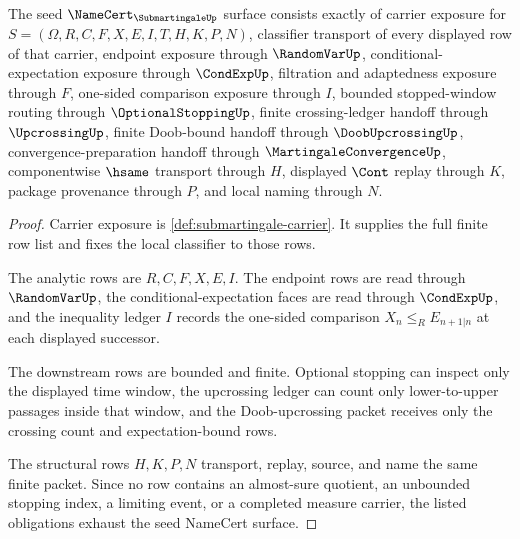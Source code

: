 \begin{theorem}
\label{thm:submartingale-namecert-obligations}
The seed $\NameCert_{\SubmartingaleUp}$ surface consists exactly of carrier exposure for $S=(\Omega,R,C,F,X,E,I,T,H,K,P,N)$, classifier transport of every displayed row of that carrier, endpoint exposure through $\RandomVarUp$, conditional-expectation exposure through $\CondExpUp$, filtration and adaptedness exposure through $F$, one-sided comparison exposure through $I$, bounded stopped-window routing through $\OptionalStoppingUp$, finite crossing-ledger handoff through $\UpcrossingUp$, finite Doob-bound handoff through $\DoobUpcrossingUp$, convergence-preparation handoff through $\MartingaleConvergenceUp$, componentwise $\hsame$ transport through $H$, displayed $\Cont$ replay through $K$, package provenance through $P$, and local naming through $N$.
\end{theorem}
\begin{proof}
Carrier exposure is \autoref{def:submartingale-carrier}. It supplies the full finite row list and fixes the local classifier to those rows.

The analytic rows are $R,C,F,X,E,I$. The endpoint rows are read through $\RandomVarUp$, the conditional-expectation faces are read through $\CondExpUp$, and the inequality ledger $I$ records the one-sided comparison $X_n\leq_R E_{n+1|n}$ at each displayed successor.

The downstream rows are bounded and finite. Optional stopping can inspect only the displayed time window, the upcrossing ledger can count only lower-to-upper passages inside that window, and the Doob-upcrossing packet receives only the crossing count and expectation-bound rows.

The structural rows $H,K,P,N$ transport, replay, source, and name the same finite packet. Since no row contains an almost-sure quotient, an unbounded stopping index, a limiting event, or a completed measure carrier, the listed obligations exhaust the seed NameCert surface.
\end{proof}

